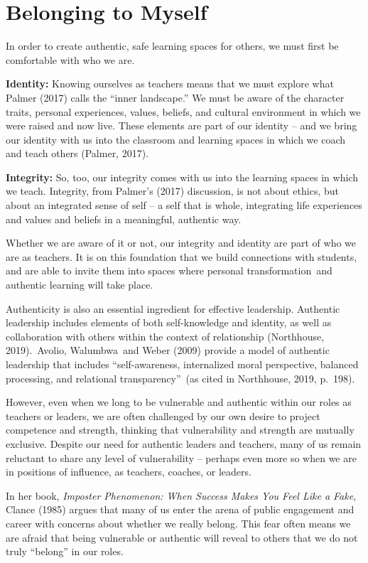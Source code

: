 \documentclass[
]{book}
\begin{document}
\hypertarget{belonging-to-myself}{%
\section{Belonging to Myself}\label{belonging-to-myself}}

In order to create authentic, safe learning spaces for others, we must first be comfortable with who we are.

\textbf{Identity:} Knowing ourselves as teachers means that we must explore what Palmer (2017) calls the ``inner landscape.'' We must be aware of the character traits, personal experiences, values, beliefs, and cultural environment in which we were raised and now live. These elements are part of our identity -- and we bring our identity with us into the classroom and learning spaces in which we coach and teach others (Palmer, 2017).

\textbf{Integrity:} So, too, our integrity comes with us into the learning spaces in which we teach. Integrity, from Palmer's (2017) discussion, is not about ethics, but about an integrated sense of self -- a self that is whole, integrating life experiences and values and beliefs in a meaningful, authentic way.

Whether we are aware of it or not, our integrity and identity are part of who we are as teachers. It is on this foundation that we build connections with students, and are able to invite them into spaces where personal transformation~and authentic learning will take place.

Authenticity is also an essential ingredient for effective leadership. Authentic leadership includes elements of both self-knowledge and identity, as well as collaboration with others within the context of relationship (Northhouse, 2019).~Avolio, Walumbwa~and Weber (2009) provide a model of authentic leadership that includes ``self-awareness, internalized moral perspective, balanced processing, and relational transparency''~(as cited in Northhouse, 2019, p.~198).

However, even when we long to be vulnerable and authentic within our roles as teachers or leaders, we are often challenged by our own desire to project competence and strength, thinking that vulnerability and strength are mutually exclusive. Despite our need for authentic leaders and teachers, many of us remain reluctant to share any level of vulnerability -- perhaps even more so when we are in positions of influence, as teachers, coaches, or leaders.

In her book, \emph{Imposter Phenomenon: When Success Makes You Feel Like a Fake}, Clance (1985) argues that many of us enter the arena of public engagement and career with concerns about whether we really belong. This fear often means we are afraid that being vulnerable or authentic will reveal to others that we do not truly ``belong'' in our roles.
\end{document}
